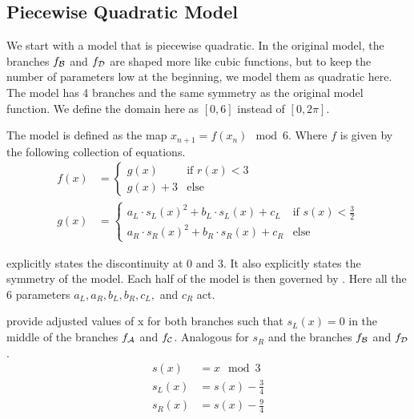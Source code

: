 \subsection{Piecewise Quadratic Model}

We start with a model that is piecewise quadratic.
In the original model, the branches $f_{\mathcal{B}}$ and $f_{\mathcal{D}}$ are shaped more like cubic functions, but to keep the number of parameters low at the beginning, we model them as quadratic here.
The model has 4 branches and the same symmetry as the original model function.
We define the domain here as $[0, 6]$ instead of $[0, 2\pi]$.

The model is defined as the map $x_{n+1} = f(x_n) \mod 6$.
Where $f$ is given by the following collection of equations.
\begin{align}
	f(x) & = \begin{cases}
		         g(x)     & \text{if } r(x) < 3 \\
		         g(x) + 3 & \text{else}
	         \end{cases} \label{equ:quad.full.f}                                         \\
	g(x) & = \begin{cases}
		         a_L \cdot s_L(x)^2 + b_L \cdot s_L(x) + c_L & \text{if } s(x) < \frac{3}{2} \\
		         a_R \cdot s_R(x)^2 + b_R \cdot s_R(x) + c_R & \text{else}
	         \end{cases} \label{equ:quad.full.g}
\end{align}

 explicitly states the discontinuity at $0$ and $3$.
It also explicitly states the symmetry of the model.
Each half of the model is then governed by .
Here all the 6 parameters $a_L, a_R, b_L, b_R, c_L,$ and $c_R$ act.

 provide adjusted values of x for both branches such that $s_L(x) = 0$ in the middle of the branches $f_{\mathcal{A}}$ and $f_{\mathcal{C}}$.
Analogous for $s_R$ and the branches $f_{\mathcal{B}}$ and $f_{\mathcal{D}}$.
\begin{subequations}
	\begin{align}
		s(x)   & = x \mod 3 \label{equ:quad.full.s}            \\
		s_L(x) & = s(x) - \frac{3}{4}                          \\
		s_R(x) & = s(x) - \frac{9}{4} \label{equ:quad.full.sr}
	\end{align}
\end{subequations}
